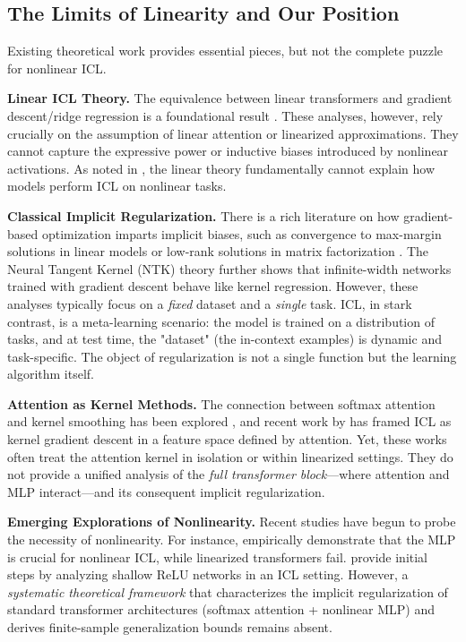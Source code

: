 \subsection{The Limits of Linearity and Our Position}
\label{subsec:positioning}

Existing theoretical work provides essential pieces, but not the complete puzzle for nonlinear ICL.

\textbf{Linear ICL Theory.} The equivalence between linear transformers and gradient descent/ridge regression is a foundational result \cite{von2023linear, akyurek2022learning, zhang2023trained}. These analyses, however, rely crucially on the assumption of linear attention or linearized approximations. They cannot capture the expressive power or inductive biases introduced by nonlinear activations. As noted in \cite{huang2023understanding}, the linear theory fundamentally cannot explain how models perform ICL on nonlinear tasks.

\textbf{Classical Implicit Regularization.} There is a rich literature on how gradient-based optimization imparts implicit biases, such as convergence to max-margin solutions in linear models \cite{soudry2018implicit} or low-rank solutions in matrix factorization \cite{gunasekar2018implicit}. The Neural Tangent Kernel (NTK) theory \cite{jacot2018neural, arora2019exact} further shows that infinite-width networks trained with gradient descent behave like kernel regression. However, these analyses typically focus on a \textit{fixed} dataset and a \textit{single} task. ICL, in stark contrast, is a meta-learning scenario: the model is trained on a distribution of tasks, and at test time, the "dataset" (the in-context examples) is dynamic and task-specific. The object of regularization is not a single function but the learning algorithm itself.

\textbf{Attention as Kernel Methods.} The connection between softmax attention and kernel smoothing has been explored \cite{tsai2019transformer, katharopoulos2020transformers}, and recent work by \cite{chen2024kernels} has framed ICL as kernel gradient descent in a feature space defined by attention. Yet, these works often treat the attention kernel in isolation or within linearized settings. They do not provide a unified analysis of the \textit{full transformer block}—where attention and MLP interact—and its consequent implicit regularization.

\textbf{Emerging Explorations of Nonlinearity.} Recent studies have begun to probe the necessity of nonlinearity. For instance, \cite{sohn2024understanding} empirically demonstrate that the MLP is crucial for nonlinear ICL, while linearized transformers fail. \cite{liu2023theoretical} provide initial steps by analyzing shallow ReLU networks in an ICL setting. However, a \textit{systematic theoretical framework} that characterizes the implicit regularization of standard transformer architectures (softmax attention + nonlinear MLP) and derives finite-sample generalization bounds remains absent.

